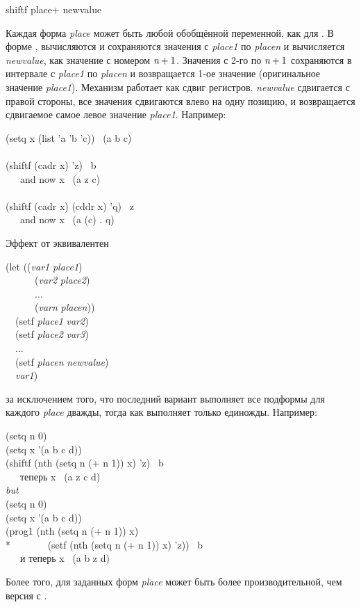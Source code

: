 \begin{defmac}
shiftf {place}+ newvalue

Каждая форма \emph{place} может быть любой обобщённой переменной, как для
. 
В форме , вычисляются и сохраняются значения с \emph{place1} по
\emph{placen} и вычисляется \emph{newvalue}, как значение с номером $\emph{n}+1$.
Значения с 2-го по $\emph{n}+1$ сохраняются в интервале с \emph{place1} по
\emph{placen} и возвращается 1-ое значение (оригинальное значение \emph{place1}).
Механизм работает как сдвиг регистров. \emph{newvalue} сдвигается с правой
стороны, все значения сдвигаются влево на одну позицию, и возвращается
сдвигаемое самое левое значение \emph{place1}. Например:
\begin{lisp}
(setq x (list 'a 'b 'c)) \EV\ (a b c) \\
 \\
(shiftf (cadr x) 'z) \EV\ b \\
~~~\textrm{and now} x \EV\ (a z c) \\
 \\
(shiftf (cadr x) (cddr x) 'q) \EV\ z \\
~~~\textrm{and now} x \EV\ (a (c) . q)
\end{lisp}
Эффект от  эквивалентен
\begin{lisp}
(let ((\emph{var1} \emph{place1}) \\
~~~~~~(\emph{var2} \emph{place2}) \\
~~~~~~... \\
~~~~~~(\emph{varn} \emph{placen})) \\
~~(setf \emph{place1} \emph{var2}) \\
~~(setf \emph{place2} \emph{var3}) \\
~~... \\
~~(setf \emph{placen} \emph{newvalue}) \\
~~\emph{var1})
\end{lisp}
за исключением того, что последний вариант выполняет все подформы для каждого
\emph{place} дважды, тогда как  выполняет только единожды.
Например:
\begin{lisp}
(setq n 0) \\
(setq x '(a b c d)) \\
(shiftf (nth (setq n (+ n 1)) x) 'z) \EV\ b \\
~~~\textrm{теперь} x \EV\ (a z c d) \\[4pt]
\emph{but} \\[4pt]
(setq n 0) \\
(setq x '(a b c d)) \\
(prog1 (nth (setq n (+ n 1)) x) \\*
~~~~~~~(setf (nth (setq n (+ n 1)) x) 'z)) \EV\ b \\
~~~\textrm{и теперь} x \EV\ (a b z d)
\end{lisp}
Более того, для заданных форм \emph{place}  может быть более
производительной, чем версия с .
\end{defmac}

